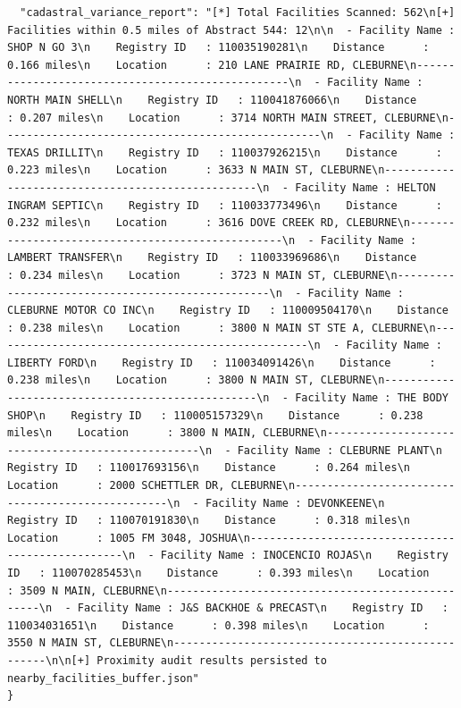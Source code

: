 \documentclass{article}
\begin{document}
\begin{verbatim}
  "cadastral_variance_report": "[*] Total Facilities Scanned: 562\n[+] Facilities within 0.5 miles of Abstract 544: 12\n\n  - Facility Name : SHOP N GO 3\n    Registry ID   : 110035190281\n    Distance      : 0.166 miles\n    Location      : 210 LANE PRAIRIE RD, CLEBURNE\n--------------------------------------------------\n  - Facility Name : NORTH MAIN SHELL\n    Registry ID   : 110041876066\n    Distance      : 0.207 miles\n    Location      : 3714 NORTH MAIN STREET, CLEBURNE\n--------------------------------------------------\n  - Facility Name : TEXAS DRILLIT\n    Registry ID   : 110037926215\n    Distance      : 0.223 miles\n    Location      : 3633 N MAIN ST, CLEBURNE\n--------------------------------------------------\n  - Facility Name : HELTON INGRAM SEPTIC\n    Registry ID   : 110033773496\n    Distance      : 0.232 miles\n    Location      : 3616 DOVE CREEK RD, CLEBURNE\n--------------------------------------------------\n  - Facility Name : LAMBERT TRANSFER\n    Registry ID   : 110033969686\n    Distance      : 0.234 miles\n    Location      : 3723 N MAIN ST, CLEBURNE\n--------------------------------------------------\n  - Facility Name : CLEBURNE MOTOR CO INC\n    Registry ID   : 110009504170\n    Distance      : 0.238 miles\n    Location      : 3800 N MAIN ST STE A, CLEBURNE\n--------------------------------------------------\n  - Facility Name : LIBERTY FORD\n    Registry ID   : 110034091426\n    Distance      : 0.238 miles\n    Location      : 3800 N MAIN ST, CLEBURNE\n--------------------------------------------------\n  - Facility Name : THE BODY SHOP\n    Registry ID   : 110005157329\n    Distance      : 0.238 miles\n    Location      : 3800 N MAIN, CLEBURNE\n--------------------------------------------------\n  - Facility Name : CLEBURNE PLANT\n    Registry ID   : 110017693156\n    Distance      : 0.264 miles\n    Location      : 2000 SCHETTLER DR, CLEBURNE\n--------------------------------------------------\n  - Facility Name : DEVONKEENE\n    Registry ID   : 110070191830\n    Distance      : 0.318 miles\n    Location      : 1005 FM 3048, JOSHUA\n--------------------------------------------------\n  - Facility Name : INOCENCIO ROJAS\n    Registry ID   : 110070285453\n    Distance      : 0.393 miles\n    Location      : 3509 N MAIN, CLEBURNE\n--------------------------------------------------\n  - Facility Name : J&S BACKHOE & PRECAST\n    Registry ID   : 110034031651\n    Distance      : 0.398 miles\n    Location      : 3550 N MAIN ST, CLEBURNE\n--------------------------------------------------\n\n[+] Proximity audit results persisted to nearby_facilities_buffer.json"
}
\end{verbatim}
\end{document}
